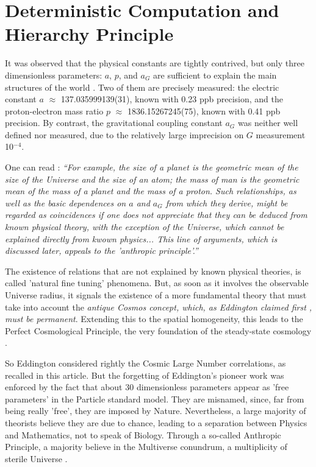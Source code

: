 \documentclass[twoside,draft]{article}
\begin{document}
\begin{sloppypar}
{\section{Deterministic Computation and Hierarchy Principle}
It was observed that the physical constants are tightly contrived, but only three dimensionless parameters: $a$, $p$, and $a_{G}$ are sufficient to explain the main structures of the world \cite{Carr}. Two of them are precisely measured: the electric constant $a$ $\approx$ 137.035999139(31), known with 0.23 ppb precision, and the proton-electron mass ratio $p$ $\approx$ 1836.15267245(75), known with 0.41 ppb precision. By contrast, the gravitational coupling constant $a_{G}$ was neither well defined nor measured, due to the relatively large imprecision on $G$ measurement 10$^{-4}\!$.

One can read \cite{Carr}: \textit{“For example, the size of a planet is the geometric mean of the size of the Universe and the size of an atom; the mass of man is the geometric mean of the mass of a planet and the mass of a proton. Such relationships, as well as the basic dependences on $a$ and $a_G$ from which they derive, might be regarded as coincidences if one does not appreciate that they can be deduced from known physical theory, with the exception of the Universe, which cannot be explained directly from kwown physics... This line of arguments, which is discussed later, appeals to the 'anthropic principle'.”}

The existence of relations that are not explained by known physical theories, is called 'natural fine tuning' phenomena. But, as soon as it involves the observable Universe radius, it signals the existence of a more fundamental theory that must take into account the \textit{antique Cosmos concept, which, as Eddington claimed first \cite{Eddy}, must be permanent}. Extending this to the spatial homogeneity, this leads to the Perfect Cosmological Principle, the very foundation of the steady-state cosmology \cite{Sanchez1}.

So Eddington considered rightly the Cosmic Large Number correlations, as recalled in this article. But the forgetting of Eddington's pioneer work was enforced by the fact that about 30 dimensionless parameters appear as 'free parameters' in the Particle standard model. They are misnamed, since, far from being really 'free', they are imposed by Nature. Nevertheless, a large majority of theorists believe they are due to chance, leading to a separation between Physics and Mathematics, not to speak of Biology. Through a so-called Anthropic Principle, a majority believe in the Multiverse conundrum, a multiplicity of sterile Universe \cite{Carr}.

}
\end{sloppypar}
\end{document}
